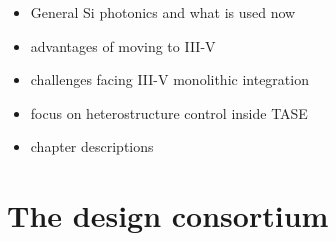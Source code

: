 \begin{itemize}
    \item General Si photonics and what is used now
    \item advantages of moving to III-V
    \item challenges facing III-V monolithic integration
    \item focus on heterostructure control inside TASE
    \item chapter descriptions
\end{itemize}

\section{\texorpdfstring{The \acs{design} consortium}{The DESIGN-EID consortium}}

